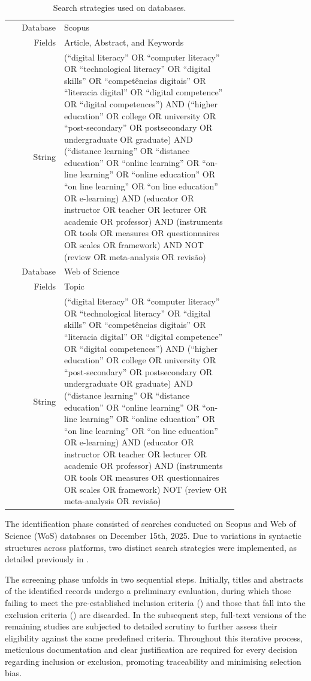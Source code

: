\documentclass[english]{textolivre}
\begin{document}
\begin{table}[htbp]
\centering
\caption{Search strategies used on databases.}
\label{tab1}
\small
\begin{tabular}{r | p{0.76\linewidth}}
Database & Scopus \\
Fields & Article, Abstract, and Keywords \\
String &
(“digital literacy” OR “computer literacy” OR “technological literacy” OR
“digital skills” OR “competências digitais” OR “literacia digital” OR
“digital competence” OR “digital competences”) AND
(“higher education” OR college OR university OR “post-secondary” OR
postsecondary OR undergraduate OR graduate) AND
(“distance learning” OR “distance education” OR “online learning” OR
“on-line learning” OR “online education” OR “on line learning” OR
“on line education” OR e-learning) AND
(educator OR instructor OR teacher OR lecturer OR academic OR professor) AND
(instruments OR tools OR measures OR questionnaires OR scales OR framework)
AND NOT (review OR meta-analysis OR revisão) \\
Database & Web of Science \\
Fields & Topic \\
String &
(“digital literacy” OR “computer literacy” OR “technological literacy” OR
“digital skills” OR “competências digitais” OR “literacia digital” OR
“digital competence” OR “digital competences”) AND
(“higher education” OR college OR university OR “post-secondary” OR
postsecondary OR undergraduate OR graduate) AND
(“distance learning” OR “distance education” OR “online learning” OR
“on-line learning” OR “online education” OR “on line learning” OR
“on line education” OR e-learning) AND
(educator OR instructor OR teacher OR lecturer OR academic OR professor) AND
(instruments OR tools OR measures OR questionnaires OR scales OR framework)
NOT (review OR meta-analysis OR revisão) \\
\end{tabular}
\end{table}

The identification phase consisted of searches conducted on Scopus and Web of Science (WoS) databases on December 15th, 2025. Due to variations in syntactic structures across platforms, two distinct search strategies were implemented, as detailed previously in .

The screening phase unfolds in two sequential steps. Initially, titles and abstracts of the identified records undergo a preliminary evaluation, during which those failing to meet the pre-established inclusion criteria () and those that fall into the exclusion criteria () are discarded. In the subsequent step, full-text versions of the remaining studies are subjected to detailed scrutiny to further assess their eligibility against the same predefined criteria. Throughout this iterative process, meticulous documentation and clear justification are required for every decision regarding inclusion or exclusion, promoting traceability and minimising selection bias.
\end{document}
